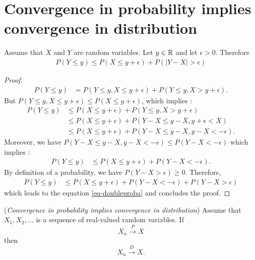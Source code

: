 \documentclass{article}
\begin{document}

\section{Convergence in probability implies convergence in distribution}

\begin{theorem}
\label{theo-doubleproba}
Assume that $X$ and $Y$ are random variables. 
Let $y\in\mathbb{R}$ and let $\epsilon>0$. 
Therefore
\begin{align}
\label{eq-doubleproba}
P(Y\leq y) \leq P(X\leq y+\epsilon) + P(|Y-X|> \epsilon)
\end{align}
\end{theorem}

\begin{proof}
\begin{align*}
P(Y\leq y)
& = P(Y\leq y,X\leq y+\epsilon)+P(Y\leq y,X> y+\epsilon).
\end{align*}
But $P(Y\leq y,X\leq y+\epsilon) \leq P(X\leq y+\epsilon)$, which implies :
\begin{align*}
P(Y\leq y)
& \leq P(X\leq y+\epsilon)+P(Y\leq y,X> y+\epsilon) \\
& \leq P(X\leq y+\epsilon)+P(Y-X\leq y-X, y+\epsilon<X) \\
& \leq P(X\leq y+\epsilon)+P(Y-X\leq y-X, y-X <-\epsilon).
\end{align*}
Moreover, we have $P(Y-X\leq y-X, y-X <-\epsilon)\leq P(Y-X<-\epsilon)$ which implies : 
\begin{align*}
P(Y\leq y)
& \leq P(X\leq y+\epsilon)+P(Y-X<-\epsilon).
\end{align*}
By definition of a probability, we have $P(Y-X>\epsilon)\geq 0$. 
Therefore, 
\begin{align*}
P(Y\leq y)
& \leq P(X\leq y+\epsilon)+P(Y-X<-\epsilon) + P(Y-X>\epsilon)
\end{align*}
which leads to the equation \ref{eq-doubleproba} and concludes the proof.
\end{proof}


\begin{theorem}
\label{theo-convprovdist}
(\emph{Convergence in probability implies convergence in distribution})
Assume that $X_1,X_2,...$ is a sequence of real-valued random variables. 
If 
$$
X_n \xrightarrow{P} X
$$
then
$$
X_n \xrightarrow{D} X.
$$
\end{theorem}
\end{document}

